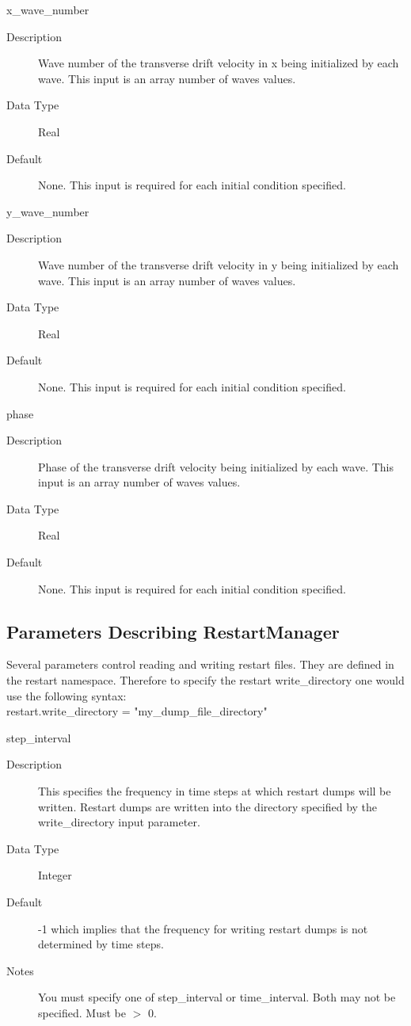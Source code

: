 \documentclass[11pt]{amsart}
\begin{document}
x\_wave\_number
\begin{description}
\item [Description] Wave number of the transverse drift velocity in x being
initialized by each wave.  This input is an array number of waves values.
\item [Data Type] Real
\item [Default] None.  This input is required for each initial condition
specified.
\end{description}

y\_wave\_number
\begin{description}
\item [Description] Wave number of the transverse drift velocity in y being
initialized by each wave.  This input is an array number of waves values.
\item [Data Type] Real
\item [Default] None.  This input is required for each initial condition
specified.
\end{description}

phase
\begin{description}
\item [Description] Phase of the transverse drift velocity being initialized by
each wave.  This input is an array number of waves values.
\item [Data Type] Real
\item [Default] None.  This input is required for each initial condition
specified.
\end{description}

\subsection*{Parameters Describing RestartManager}
Several parameters control reading and writing restart files.  They are defined
in the restart namespace.  Therefore to specify the restart write\_directory
one would use the following syntax: \\
restart.write\_directory = "my\_dump\_file\_directory"

step\_interval
\begin{description}
\item [Description] This specifies the frequency in time steps at which restart
dumps will be written.  Restart dumps are written into the directory
specified by the write\_directory input parameter.
\item [Data Type] Integer
\item [Default] -1 which implies that the frequency for writing restart dumps
is not determined by time steps.
\item [Notes] You must specify one of step\_interval or time\_interval.  Both
may not be specified.  Must be $>$ 0.
\end{description}
\end{document}
